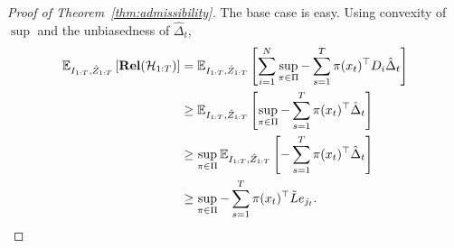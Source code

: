 \documentclass[11pt]{article}
\newcommand{\rel}{\mathbf{Rel}}
\newcommand{\hist}{{\mathcal H}}
\begin{document}
\begin{proof}[Proof of Theorem~\ref{thm:admissibility}]
  The base case is easy. Using convexity of $\sup$ and the unbiasedness of $\hat\Delta_t$,
  \begin{align*}
  \ex_{I_{1:T},\hat Z_{1:T}}\left[
  \rel(\hist_{1:T})
  \right]
  &=
    \ex_{I_{1:T},\hat Z_{1:T}}\left[
    \sum_{i=1}^N\sup_{\pi\in\Pi}
    -\sum_{s=1}^T \pi(x_t)^\top D_i \hat \Delta_t
    \right]\\
  &\geq
    \ex_{I_{1:T},\hat Z_{1:T}}\left[    
    \sup_{\pi\in\Pi}
    -\sum_{s=1}^T \pi(x_t)^\top \hat \Delta_t
    \right]\\
  &\geq
    \sup_{\pi\in\Pi}
    \ex_{I_{1:T},\hat Z_{1:T}}\left[
    -\sum_{s=1}^T \pi(x_t)^\top \hat \Delta_t
    \right]\\
      &\geq
    \sup_{\pi\in\Pi}
    -\sum_{s=1}^T \pi(x_t)^\top \tilde L e_{j_t}.
  \end{align*}



\end{proof}
\end{document}
